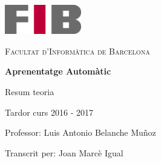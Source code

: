 \documentclass[a4paper]{report}
\begin{document}
\begin{titlepage}
	\centering
	\vspace{1cm}
	\includegraphics[width=0.25\textwidth]{images/logoFIB}
	\par\vspace{1cm}
	\textsc{ \LARGE Facultat d'Informàtica de Barcelona}
	\par\vspace{2cm}
	\textbf{\Huge Aprenentatge Automàtic}
	\par\vspace{2cm}
	{\LARGE Resum teoria}
	\par\vspace{1em}
	{\Large Tardor curs 2016 - 2017}
	\vfill
	\begin{flushright}
		\large
		Professor: Luis Antonio Belanche Muñoz \par
		Transcrit per: Joan Marcè Igual
	\end{flushright}
\end{titlepage}

\setlength{\parskip}{0.6em}
\tableofcontents
\pagebreak

\setlength{\parindent}{0pt}
\setlength{\parskip}{1em}









\end{document}
